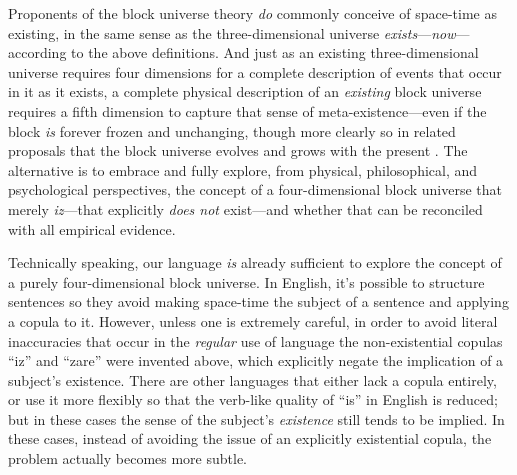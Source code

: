 \documentclass[aps,rmp,groupedaddress,twocolumn,10pt]{revtex4-2}
\begin{document}
Proponents of the block universe theory \textit{do} commonly conceive of space-time as existing, in the same sense as the three-dimensional universe \textit{exists}---\textit{now}---according to the above definitions. And just as an existing three-dimensional universe requires four dimensions for a complete description of events that occur in it as it exists, a complete physical description of an \textit{existing} block universe requires a fifth dimension to capture that sense of meta-existence---even if the block \textit{is} forever frozen and unchanging, though more clearly so in related proposals that the block universe evolves and grows with the present \cite{Ellis2014}. The alternative is to embrace and fully explore, from physical, philosophical, and psychological perspectives, the concept of a four-dimensional block universe that merely \textit{iz}---that explicitly \textit{does not} exist---and whether that can be reconciled with all empirical evidence.

Technically speaking, our language \textit{is} already sufficient to explore the concept of a purely four-dimensional block universe. In English, it's possible to structure sentences so they avoid making space-time the subject of a sentence and applying a copula to it. However, unless one is extremely careful, in order to avoid literal inaccuracies that occur in the \textit{regular} use of language the non-existential copulas ``iz'' and ``zare'' were invented above, which explicitly negate the implication of a subject's existence. There are other languages that either lack a copula entirely, or use it more flexibly so that the verb-like quality of ``is'' in English is reduced; but in these cases the sense of the subject's \textit{existence} still tends to be implied. In these cases, instead of avoiding the issue of an explicitly existential copula, the problem actually becomes more subtle.
\end{document}
